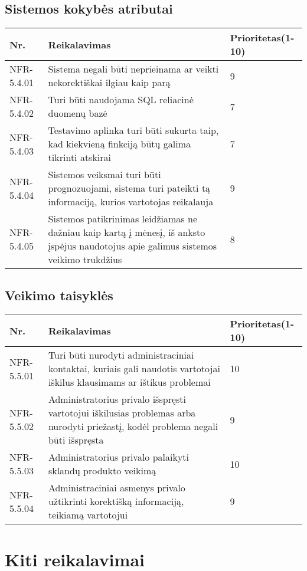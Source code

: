 \documentclass[oneside]{VUMIFPSkursinis}
\begin{document}
\subsection{Sistemos kokybės atributai}
\begin{table}[htbp]
	\begin{tabularx}{1\textwidth}{ |P{2.5cm}|X|P{3cm }| }  \hline
		Nr. & Reikalavimas & Prioritetas(1-10) \\ \hline
		NFR-5.4.01 & Sistema negali būti neprieinama ar veikti nekorektiškai ilgiau kaip parą & 9 \\ \hline
		NFR-5.4.02 & Turi būti naudojama SQL reliacinė duomenų bazė  & 7 \\ \hline
		NFR-5.4.03 & Testavimo aplinka turi būti sukurta taip, kad kiekvieną finkciją būtų galima tikrinti atskirai & 7 \\ \hline
		NFR-5.4.04 & Sistemos veiksmai turi būti prognozuojami, sistema turi pateikti tą informaciją, kurios vartotojas reikalauja & 9 \\ \hline
		NFR-5.4.05 & Sistemos patikrinimas leidžiamas ne dažniau kaip kartą į mėnesį, iš anksto įspėjus naudotojus apie galimus sistemos veikimo trukdžius  & 8 \\ \hline
	\end{tabularx}
\end{table}
\subsection{Veikimo taisyklės}
\begin{table}[htbp]
	\begin{tabularx}{1\textwidth}{ |P{2.5cm}|X|P{3cm }| }  \hline
		Nr. & Reikalavimas & Prioritetas(1-10) \\ \hline
		NFR-5.5.01 & Turi būti nurodyti administraciniai kontaktai, kuriais gali naudotis vartotojai iškilus klausimams ar ištikus problemai & 10 \\ \hline
		NFR-5.5.02 & Administratorius privalo išspręsti vartotojui iškilusias problemas arba nurodyti priežastį, kodėl problema negali būti išspręsta  & 9 \\ \hline
		NFR-5.5.03 & Administratorius privalo palaikyti sklandų produkto veikimą & 10 \\ \hline
		NFR-5.5.04 & Administraciniai asmenys privalo užtikrinti korektišką informaciją, teikiamą vartotojui & 9 \\ \hline
	\end{tabularx}
\end{table}

\section{Kiti reikalavimai}
\end{document}
